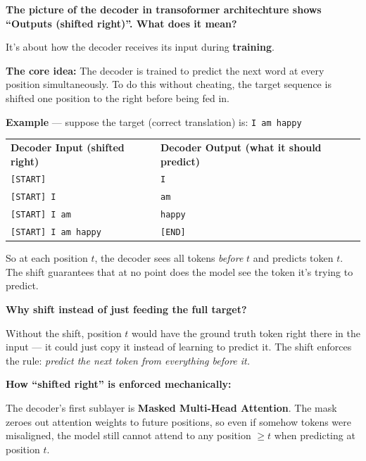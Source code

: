 \bigskip

\textbf{The picture of the decoder in transoformer architechture shows ``Outputs (shifted right)''. What does it mean?}

\medskip

It's about how the decoder receives its input during \textbf{training}.

\bigskip

\textbf{The core idea:} The decoder is trained to predict the next word at every position simultaneously. To do this without cheating, the target sequence is shifted one position to the right before being fed in.

\bigskip

\textbf{Example} --- suppose the target (correct translation) is: \texttt{I am happy}

\begin{center}
\begin{tabular}{ll}
\textbf{Decoder Input (shifted right)} & \textbf{Decoder Output (what it should predict)} \\[4pt]
\texttt{[START]} & \texttt{I} \\
\texttt{[START] I} & \texttt{am} \\
\texttt{[START] I am} & \texttt{happy} \\
\texttt{[START] I am happy} & \texttt{[END]} \\
\end{tabular}
\end{center}

So at each position $t$, the decoder sees all tokens \textit{before} $t$ and predicts token $t$. The shift guarantees that at no point does the model see the token it's trying to predict.

\bigskip

\textbf{Why shift instead of just feeding the full target?}

Without the shift, position $t$ would have the ground truth token right there in the input --- it could just copy it instead of learning to predict it. The shift enforces the rule: \textit{predict the next token from everything before it.}

\bigskip

\textbf{How ``shifted right'' is enforced mechanically:}

The decoder's first sublayer is \textbf{Masked Multi-Head Attention}. The mask zeroes out attention weights to future positions, so even if somehow tokens were misaligned, the model still cannot attend to any position $\geq t$ when predicting at position $t$.

